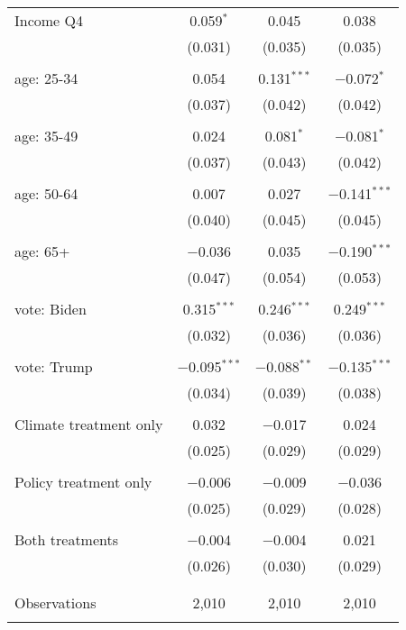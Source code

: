 \begin{tabular}{@{\extracolsep{5pt}}lccc}
 Income Q4 & 0.059$^{*}$ & 0.045 & 0.038 \\ 
  & (0.031) & (0.035) & (0.035) \\ 
  & & & \\ 
 age: 25-34 & 0.054 & 0.131$^{***}$ & $-$0.072$^{*}$ \\ 
  & (0.037) & (0.042) & (0.042) \\ 
  & & & \\ 
 age: 35-49 & 0.024 & 0.081$^{*}$ & $-$0.081$^{*}$ \\ 
  & (0.037) & (0.043) & (0.042) \\ 
  & & & \\ 
 age: 50-64 & 0.007 & 0.027 & $-$0.141$^{***}$ \\ 
  & (0.040) & (0.045) & (0.045) \\ 
  & & & \\ 
 age: 65+ & $-$0.036 & 0.035 & $-$0.190$^{***}$ \\ 
  & (0.047) & (0.054) & (0.053) \\ 
  & & & \\ 
 vote: Biden & 0.315$^{***}$ & 0.246$^{***}$ & 0.249$^{***}$ \\ 
  & (0.032) & (0.036) & (0.036) \\ 
  & & & \\ 
 vote: Trump & $-$0.095$^{***}$ & $-$0.088$^{**}$ & $-$0.135$^{***}$ \\ 
  & (0.034) & (0.039) & (0.038) \\ 
  & & & \\ 
 Climate treatment only & 0.032 & $-$0.017 & 0.024 \\ 
  & (0.025) & (0.029) & (0.029) \\ 
  & & & \\ 
 Policy treatment only & $-$0.006 & $-$0.009 & $-$0.036 \\ 
  & (0.025) & (0.029) & (0.028) \\ 
  & & & \\ 
 Both treatments & $-$0.004 & $-$0.004 & 0.021 \\ 
  & (0.026) & (0.030) & (0.029) \\ 
  & & & \\ 
\hline \\[-1.8ex] 

Observations & 2,010 & 2,010 & 2,010 \\ 
\hline 
\hline \\[-1.8ex] 
\end{tabular} 